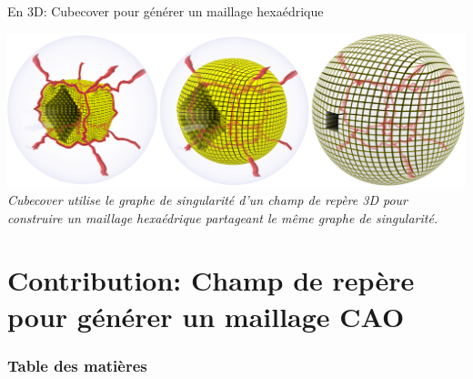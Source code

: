 \documentclass{beamer}
\begin{document}
\begin{frame}{En 3D: Cubecover pour générer un maillage hexaédrique}
    \begin{center}
        \includegraphics[width=\linewidth]{img/cubecover/B34_graphe_interieur.PNG}
        \small{
            \textit{Cubecover utilise le graphe de singularité d'un champ de repère 3D pour construire un maillage hexaédrique partageant le même graphe de singularité.}
        }
    \end{center}
\end{frame}
\section{Contribution: Champ de repère pour générer un maillage CAO }
\begin{frame}
    \frametitle{Table des matières}
    \tableofcontents[currentsection, sectionstyle=show/shaded, subsectionstyle=show/show/hide]
\end{frame}
\end{document}
